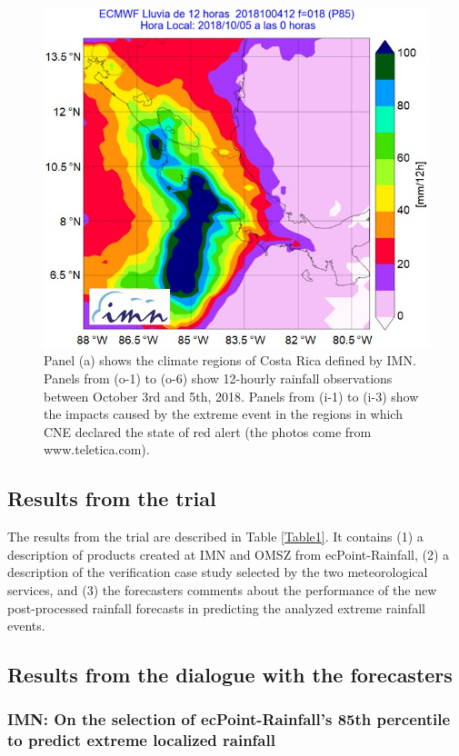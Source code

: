 \documentclass[twocol]{ametsocV5} %
\begin{document}
\begin{figure}
\centerline{\includegraphics[width=39pc]{manuscript/Figures/Fig5.jpg}}
\caption{Panel (a) shows the climate regions of Costa Rica defined by IMN. Panels from (o-1) to (o-6) show 12-hourly rainfall observations between October 3rd and 5th, 2018. Panels from (i-1) to (i-3) show the impacts caused by the extreme event in the regions in which CNE declared the state of red alert (the photos come from www.teletica.com).}
\label{Fig5}
\end{figure}


\subsection{Results from the trial}
The results from the trial are described in Table \ref{Table1}. It contains (1) a description of products created at IMN and OMSZ from ecPoint-Rainfall, (2) a description of the verification case study selected by the two meteorological services, and (3) the forecasters comments about the performance of the new post-processed rainfall forecasts in predicting the analyzed extreme rainfall events.

\subsection{Results from the dialogue with the forecasters}

\subsubsection{IMN: On the selection of ecPoint-Rainfall's 85th percentile to predict extreme localized rainfall}
\end{document}
